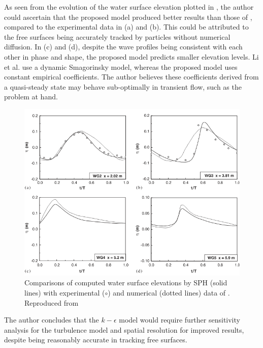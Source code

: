 As seen from the evolution of the water surface elevation plotted in , the author could ascertain that the proposed model produced better results than those of \cite{li2004wave}, compared to the experimental data in (a) and (b). This could be attributed to the free surfaces being accurately tracked by particles without numerical diffusion. 
In (c) and (d), despite the wave profiles being consistent with each other in phase and shape, the proposed model predicts smaller elevation levels. Li et al. use a dynamic Smagorinsky model, whereas the proposed model uses constant empirical coefficients. The author believes these coefficients derived from a quasi-steady state may behave sub-optimally in transient flow, such as the problem at hand.
\begin{figure}[H]
    \centering
    \includegraphics[scale=0.9]{Figures/research_papers/Shao2006-water-surf-elevations.png}
    \caption{Comparisons of computed water surface elevations by SPH (solid lines) with experimental ($\circ$) and numerical (dotted lines) data of \cite{li2004wave}. Reproduced from \cite{Shao2006}}
    \label{fig:Shao2006-water-surf-elevations}
\end{figure}

The author concludes that the $k-\epsilon$ model would require further sensitivity analysis for the turbulence model and spatial resolution for improved results, despite being reasonably accurate in tracking free surfaces.

